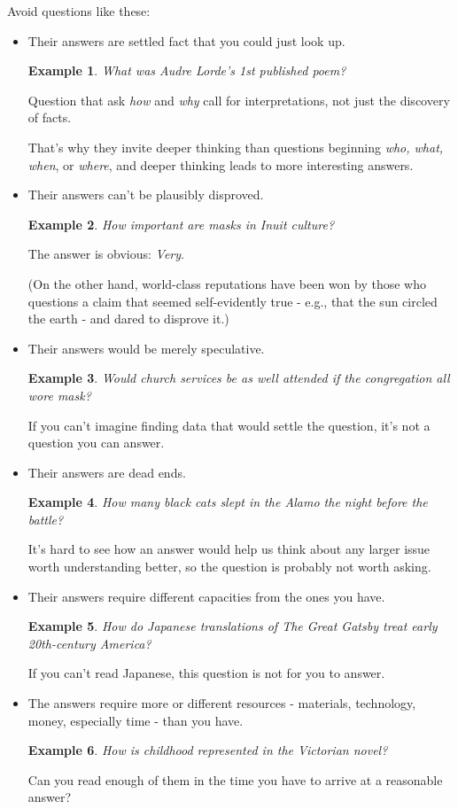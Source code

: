 \documentclass[oneside]{book}
\numberwithin{equation}{section}
\newtheorem{example}{Example}[section]
\begin{document}
Avoid questions like these:
\begin{itemize}
    \item Their answers are settled fact that you could just look up.
    \begin{example}
        What was Audre Lorde's 1st published poem?
    \end{example}
    Question that ask \textit{how} and \textit{why} call for interpretations, not just the discovery of facts.
    
    That's why they invite deeper thinking than questions beginning \textit{who, what, when}, or \textit{where}, and deeper thinking leads to more interesting answers.
    \item Their answers can't be plausibly disproved.
    \begin{example}
        How important are masks in Inuit culture?
    \end{example}
    The answer is obvious: \textit{Very}.
    
    
    (On the other hand, world-class reputations have been won by those who questions a claim that seemed self-evidently true - e.g., that the sun circled the earth - and dared to disprove it.)
    \item Their answers would be merely speculative.
    \begin{example}
        Would church services be as well attended if the congregation all wore mask?
    \end{example}
    If you can't imagine finding data that would settle the question, it's not a question you can answer.
    \item Their answers are dead ends.
    \begin{example}
        How many black cats slept in the Alamo the night before the battle?
    \end{example}
    It's hard to see how an answer would help us think about any larger issue worth understanding better, so the question is probably not worth asking.
    \item Their answers require different capacities from the ones you have.
    \begin{example}
        How do Japanese translations of \emph{The Great Gatsby} treat early 20th-century America?
    \end{example}
    If you can't read Japanese, this question is not for you to answer.
    \item The answers require more or different resources - materials, technology, money, especially time - than you have.
    \begin{example}
        How is childhood represented in the Victorian novel?
    \end{example}
    Can you read enough of them in the time you have to arrive at a reasonable answer?
\end{itemize}
\end{document}
